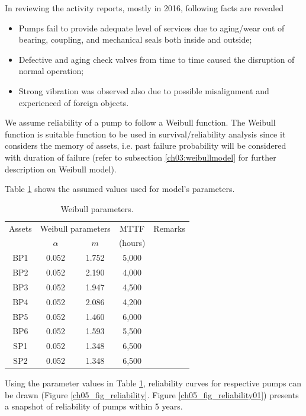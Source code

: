 In reviewing the activity reports, mostly in 2016, following facts are revealed

\begin{itemize}
\item Pumps fail to provide adequate level of services due to aging/wear out of bearing, coupling, and mechanical seals both inside and outside;
\item Defective and aging check valves from time to time caused the disruption of normal operation;
\item Strong vibration was observed also due to possible misalignment and experienced of foreign objects.
\end{itemize}

We assume reliability of a pump to follow a Weibull function. The Weibull function is suitable function to be used in survival/reliability analysis since it considers the memory of assets, i.e. past failure probability will be considered with duration of failure (refer to subsection \ref{ch03:weibullmodel} for further description on Weibull model).

Table \ref{ch05_tbl_weibullpara} shows the assumed values used for model's parameters.

\begin{table}[h]
	\caption{Weibull parameters.}
	\label{ch05_tbl_weibullpara}
	{\footnotesize
\begin{tabular}{c|c|c|c|l}
	\hline
	Assets & \multicolumn{2}{c|}{Weibull parameters} & MTTF & Remarks \\ 
	\cline{2-3}
	& $\alpha$ & $m$ & (hours) &  \\ 
	\hline
	BP1 & 0.052 & 1.752 & 5,000 &  \\ 
	BP2 & 0.052 & 2.190 & 4,000 &  \\ 
	BP3 & 0.052 & 1.947 & 4,500 &  \\ 
	BP4 & 0.052 & 2.086 & 4,200 &  \\ 
	BP5 & 0.052 & 1.460 & 6,000 &  \\ 
	BP6 & 0.052 & 1.593 & 5,500 &  \\ 
	SP1 & 0.052 & 1.348 & 6,500 &  \\ 
	SP2 & 0.052 & 1.348 & 6,500 &  \\ 
	\hline
\end{tabular}
	}
\end{table}

Using the parameter values in Table \ref{ch05_tbl_weibullpara}, reliability curves for respective pumps can be drawn (Figure \ref{ch05_fig_reliability}. Figure \ref{ch05_fig_reliability01}) presents a snapshot of reliability of pumps within 5 years. 

